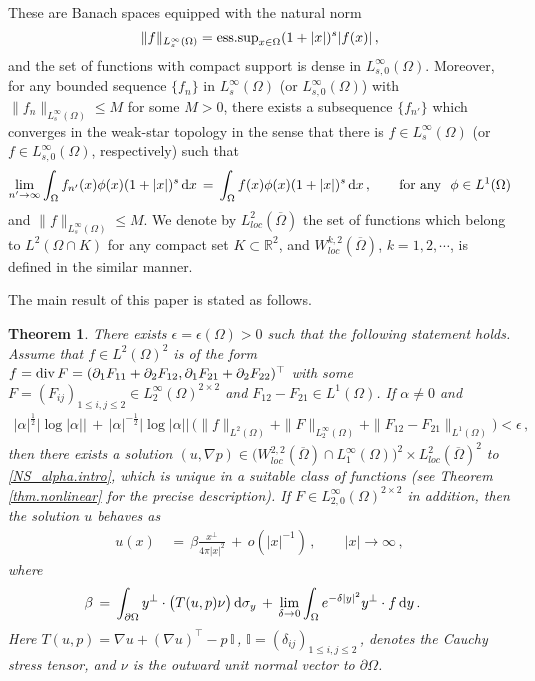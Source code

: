 \documentclass[11pt,a4paper]{article}
\newtheorem{theorem}{Theorem }[section]
\newcommand{\R}{\mathbb{R}}
\newcommand{\dd}{\,{\rm d}}
\begin{document}
%
These are Banach spaces equipped with the natural norm 
$$\|f\|_{L^\infty_s (\Omega)} = {\rm ess.sup}_{x\in\Omega} (1+|x|)^s |f(x)|\,,$$
and the set of functions with compact support is dense in $L^\infty_{s,0}(\Omega)$. Moreover, for any bounded sequence $\{f_n\}$ in $L^\infty_s (\Omega)$ (or $L^\infty_{s,0}(\Omega)$) with $\| f_n \|_{L^\infty_s (\Omega)} \le M$ for some $M>0$, there exists a subsequence $\{f_{n'}\}$ which converges in the weak-star topology in the sense that there is $f\in L^\infty_s (\Omega)$ (or $f\in L^\infty_{s,0}(\Omega)$, respectively) such that 
$$\lim_{n'\rightarrow \infty} \int_\Omega f_{n'} (x)  \phi (x)  (1+|x|)^s \dd x \, = \,  \int_\Omega f (x) \phi (x) (1+|x|)^s \dd x\,, \qquad {\rm for ~any~}~ \phi \in L^1 (\Omega)$$ and $\| f \|_{L^\infty_s (\Omega)} \le M$.
We denote by $L^2_{loc}(\overline{\Omega})$ the set of functions which belong to 
$L^2 (\Omega \cap K)$ for any compact set $K\subset \R^2$, and $W^{k,2}_{loc} (\overline{\Omega})$, $k=1,2,\cdots$, is defined in the similar manner.

The main result of this paper is stated as follows.
\begin{theorem}\label{thm.main} There exists $\epsilon=\epsilon (\Omega)>0$ such that the following statement holds. Assume that $f\in L^2 (\Omega)^2$ is of the form $f={\rm div}\, F=(\partial_1 F_{11} + \partial_2 F_{12}, \partial_1 F_{21} + \partial_2 F_{22})^\top$ with some $F=(F_{ij})_{1\leq i,j\leq 2}\in L^\infty_2 (\Omega)^{2\times 2}$ and $F_{12}-F_{21}\in L^1 (\Omega)$. If $\alpha \ne 0$ and 
%
\begin{align}\label{est.thm.main.1}
|\alpha|^\frac12\big  |\log |\alpha | \big | \, + \, |\alpha|^{-\frac12} \big  |\log |\alpha| \big | \, \big ( \| f \|_{L^2 (\Omega)} + \| F \|_{L^\infty_2 (\Omega)} + \| F_{12}-F_{21} \|_{L^1 (\Omega)} \big ) <\epsilon\,,
\end{align}
%
then there exists a solution $(u,\nabla p)\in \big (W^{2,2}_{loc}(\overline{\Omega}) \cap L^\infty_1 (\Omega) \big )^2 \times L^2_{loc} (\overline{\Omega})^2$ to \eqref{NS_alpha.intro}, which is unique in a suitable class of functions (see Theorem \ref{thm.nonlinear} for the precise description). If $F\in L^\infty_{2,0} (\Omega)^{2\times 2}$ in addition, then the solution $u$ behaves as 
%
\begin{align}\label{est.thm.main.2}
u(x) & \, = \, \beta \frac{x^\bot}{4\pi |x|^2} \, + \, o (|x|^{-1})\,, \qquad |x|\rightarrow \infty\,,
\end{align}
%
where
%
\begin{align}\label{est.thm.main.3}
\beta & \, = \, \int_{\partial\Omega} y^\bot \cdot \big ( T (u,p) \nu \big ) \dd \sigma_y \, + \, \lim_{\delta\rightarrow 0} \int_\Omega e^{-\delta |y|^2} y^\bot \cdot f \dd y\,. 
\end{align}
%
Here $T(u,p) = \nabla u + (\nabla u)^\top - p \, \mathbb{I}$\,, $\mathbb{I}=(\delta_{ij})_{1\leq i,j\leq 2}$\,, denotes the Cauchy stress tensor, and $\nu$ is the outward unit normal vector to $\partial\Omega$.
\end{theorem}
\end{document}
